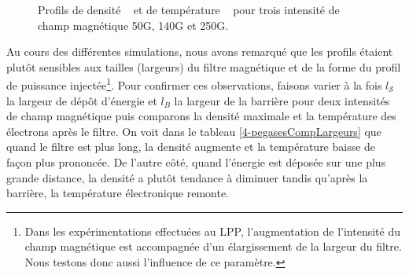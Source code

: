 \begin{refsection}
\begin{figure}[!htbp]
  \centering
    \caption{Profils de densité ~ et de
    température ~ pour trois intensité de
    champ magnétique 50G, 140G et 250G.}
    \label{4-pegasesCompMagProfile}
\end{figure}

Au cours des différentes simulations, nous avons remarqué que les profils
étaient plutôt sensibles aux tailles (largeurs) du filtre magnétique et de la
forme du profil de puissance injectée\footnote{Dans les expérimentations
effectuées au LPP, l'augmentation de l'intensité du champ magnétique est accompagnée d'un
élargissement de la largeur du filtre. Nous testons donc aussi l'influence de
ce paramètre.}.
Pour confirmer ces observations, faisons varier à la fois $l_\mathcal{S}$ la
largeur de dépôt d'énergie et $l_B$ la largeur de la barrière pour deux intensités de
champ magnétique puis comparons la densité maximale et la température des
électrons après le filtre. On voit dans le tableau \ref{4-pegasesCompLargeurs}
que quand le filtre est plus long, la densité augmente et la température baisse
de façon plus prononcée.
De l'autre côté, quand l'énergie est déposée sur une plus grande distance, la
densité a plutôt tendance à diminuer tandis qu'après la barrière, la
température électronique remonte.


\end{refsection}
